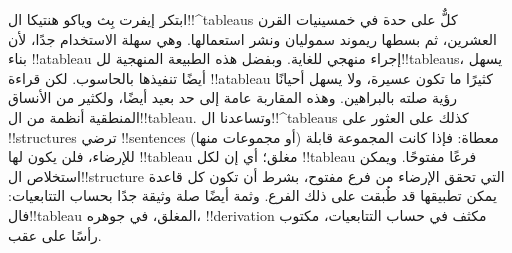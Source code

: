 \documentclass[../../../include/open-logic-section]{subfiles}
\begin{document}
ابتكر إيفرت بِث وياكو هنتيكا ال!!^{tableau}s كلٌّ على حدة في
خمسينيات القرن العشرين، ثم بسطها ريموند سموليان ونشر استعمالها. وهي
سهلة الاستخدام جدًا، لأن بناء !!a{tableau} إجراء منهجي للغاية. وبفضل
هذه الطبيعة المنهجية لل!!{tableau}s، يسهل أيضًا تنفيذها بالحاسوب. لكن
قراءة !!a{tableau} كثيرًا ما تكون عسيرة، ولا يسهل أحيانًا رؤية صلته
بالبراهين. وهذه المقاربة عامة إلى حد بعيد أيضًا، ولكثير من الأنساق
المنطقية أنظمة من ال!!{tableau}. وتساعدنا ال!!^{tableau}s كذلك على
العثور على !!{structure}s ترضي !!{sentence}s (أو مجموعات منها)
معطاة: فإذا كانت المجموعة قابلة للإرضاء، فلن يكون
لها !!{tableau} مغلق؛ أي إن لكل !!{tableau} فرعًا مفتوحًا. ويمكن
استخلاص ال!!{structure} التي تحقق الإرضاء من فرع مفتوح، بشرط أن تكون
كل قاعدة يمكن تطبيقها قد طُبقت على ذلك الفرع. وثمة أيضًا صلة وثيقة
جدًا بحساب التتابعيات: فال!!{tableau} المغلق، في جوهره،
!!{derivation} مكثف في حساب التتابعيات، مكتوب رأسًا على عقب.
\end{document}
